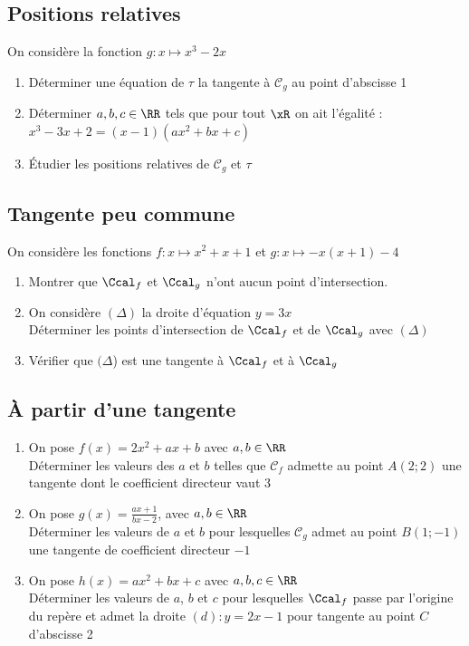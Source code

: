 \documentclass[oneside,12pt]{book}          %
\begin{document}
\subsection{Positions relatives}
 On considère la fonction $g:x\mapsto x^{3}-2x$

\begin{enumerate}
    \item Déterminer une équation de $\tau$ la tangente à $\mathscr{C}_{g}$ au point d'abscisse 1
    \item Déterminer $a,b,c\in\RR$ tels que pour tout $\xR$ on ait l'égalité :\\ $x^{3}-3x+2 = (x-1)(ax^{2}+bx+c) $
    \item Étudier les positions relatives de $\mathscr{C}_{g}$ et $\tau$
\end{enumerate}



\subsection{Tangente peu commune}

On considère les fonctions $f:x\mapsto x^2+x+1$ et $g:x\mapsto-x (x + 1) - 4$

\begin{enumerate}
    \item Montrer que $\Ccal_f$ et $\Ccal_g$ n'ont aucun point d'intersection.
    \item On considère $(\Delta)$ la droite d'équation $y=3x$\\
		Déterminer les points d'intersection de $\Ccal_f$ et de $\Ccal_g$ avec $(\Delta)$  
	\item Vérifier que $(\Delta$) est une tangente à $\Ccal_f$ et à $\Ccal_g$
\end{enumerate}



\subsection{À partir d'une tangente}
\begin{enumerate}
    \item On pose $f(x)=2x^{2}+ax+b$ avec $a,b\in\RR$ \\
    Déterminer les valeurs des $a$ et $b$ telles que $\mathscr{C}_{f}$ admette au point $A(2;2)$ une tangente dont le coefficient directeur vaut $3$
    \item On pose $g(x)=\frac{ax+1}{bx-2}$, avec $a,b\in\RR$ \\
    Déterminer les valeurs de $a$ et $b$ pour lesquelles $\mathscr{C}_{g}$ admet au point $B(1;-1)$ une tangente de coefficient directeur $-1$
    \item On pose $h(x)=ax^2+bx+c$ avec $a,b,c\in\RR$\\
    Déterminer les valeurs de $a$, $b$ et $c$ pour lesquelles $\Ccal_f$ passe par l'origine du repère et admet la droite $(d):y=2x-1$ pour tangente au point $C$ d'abscisse 2
\end{enumerate}
\end{document}
